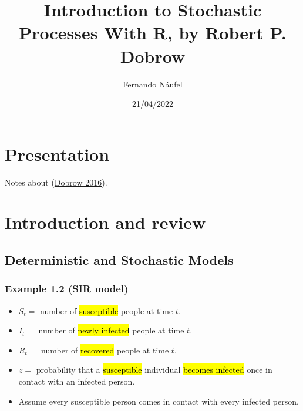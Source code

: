 \documentclass[
  11pt]{report}
\title{Introduction to Stochastic Processes With R, by Robert P. Dobrow}
\author{Fernando Náufel}
\date{21/04/2022}
\begin{document}
\maketitle

{
\setcounter{tocdepth}{1}
\tableofcontents
}
\hypertarget{presentation}{%
\chapter*{Presentation}\label{presentation}}

Notes about (\protect\hyperlink{ref-RobertP.Dobrow1345}{Dobrow 2016}).

\hypertarget{introduction-and-review}{%
\chapter{Introduction and review}\label{introduction-and-review}}

\hypertarget{deterministic-and-stochastic-models}{%
\section{Deterministic and Stochastic Models}\label{deterministic-and-stochastic-models}}

\hypertarget{example-1.2-sir-model}{%
\subsection*{Example 1.2 (SIR model)}\label{example-1.2-sir-model}}

\begin{rmdbox}

\begin{itemize}
\item
  $S_t = {}$ number of {\hl{susceptible}} people at time $t$.
\item
  $I_t = {}$ number of {\hl{newly infected}} people at time $t$.
\item
  $R_t = {}$ number of {\hl{recovered}} people at time $t$.
\item
  $z = {}$ probability that a {\hl{susceptible}} individual {\hl{becomes infected}} once in contact with an infected person.
\item
  Assume every susceptible person comes in contact with every infected person.
\end{itemize}

\end{rmdbox}
\end{document}

